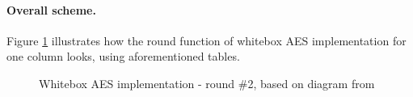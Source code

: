 \documentclass[11pt,oneside,final]{fithesis2}
\begin{document}
    \paragraph*{Overall scheme.}
    
    Figure \ref{fig:wbaes} illustrates how the round function of whitebox AES implementation for one column looks, using aforementioned tables.
    \begin{figure}
    \begin{center}
    \leavevmode
    \centerline{}
    \end{center}
    \caption{Whitebox AES implementation - round \#2, based on diagram from \citep{Muir_atutorial}}
    \label{fig:wbaes}
    \end{figure}
\end{document}
